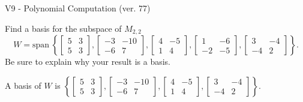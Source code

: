 \begin{exercise}
  \begin{exerciseTitle}V9 - Polynomial Computation (ver. 77)\end{exerciseTitle}
  \begin{exerciseStatement}
    Find a basis for the subspace of \(M_{2,2}\) 
\[W=\mathrm{span}\ \left\{\left[\begin{array}{cc}
5 & 3 \\
5 & 3
\end{array}\right] , \left[\begin{array}{cc}
-3 & -10 \\
-6 & 7
\end{array}\right] , \left[\begin{array}{cc}
4 & -5 \\
1 & 4
\end{array}\right] , \left[\begin{array}{cc}
1 & -6 \\
-2 & -5
\end{array}\right] , \left[\begin{array}{cc}
3 & -4 \\
-4 & 2
\end{array}\right]\right\}.\]
 Be sure to explain why your result is a basis.


  \end{exerciseStatement}
  \begin{exerciseAnswer}
   A basis of \(W\) is  \(\left\{\left[\begin{array}{cc}
5 & 3 \\
5 & 3
\end{array}\right] , \left[\begin{array}{cc}
-3 & -10 \\
-6 & 7
\end{array}\right] , \left[\begin{array}{cc}
4 & -5 \\
1 & 4
\end{array}\right] , \left[\begin{array}{cc}
3 & -4 \\
-4 & 2
\end{array}\right]\right\}\).
  


  \end{exerciseAnswer}
\end{exercise}